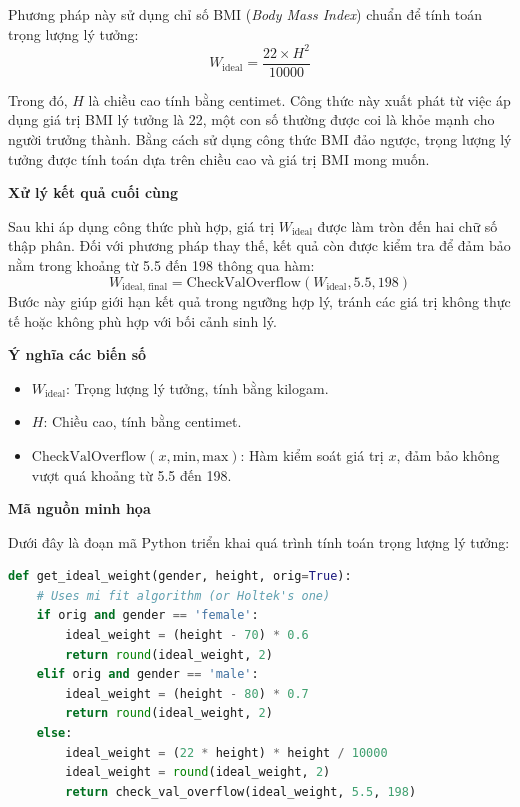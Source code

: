 Phương pháp này sử dụng chỉ số BMI (\textit{Body Mass Index}) chuẩn để tính toán trọng lượng lý tưởng:
\[
W_{\text{ideal}} = \frac{22 \times H^2}{10000}
\]

Trong đó, \( H \) là chiều cao tính bằng centimet. Công thức này xuất phát từ việc áp dụng giá trị BMI lý tưởng là 22, một con số thường được coi là khỏe mạnh cho người trưởng thành. Bằng cách sử dụng công thức BMI đảo ngược, trọng lượng lý tưởng được tính toán dựa trên chiều cao và giá trị BMI mong muốn.

\textbf{Xử lý kết quả cuối cùng}

Sau khi áp dụng công thức phù hợp, giá trị \( W_{\text{ideal}} \) được làm tròn đến hai chữ số thập phân. Đối với phương pháp thay thế, kết quả còn được kiểm tra để đảm bảo nằm trong khoảng từ 5.5 đến 198 thông qua hàm:
\[
W_{\text{ideal, final}} = \text{CheckValOverflow}(W_{\text{ideal}}, 5.5, 198)
\]
Bước này giúp giới hạn kết quả trong ngưỡng hợp lý, tránh các giá trị không thực tế hoặc không phù hợp với bối cảnh sinh lý.

\textbf{Ý nghĩa các biến số}

\begin{itemize}
    \item \( W_{\text{ideal}} \): Trọng lượng lý tưởng, tính bằng kilogam.
    \item \( H \): Chiều cao, tính bằng centimet.
    \item \( \text{CheckValOverflow}(x, \text{min}, \text{max}) \): Hàm kiểm soát giá trị \( x \), đảm bảo không vượt quá khoảng từ 5.5 đến 198.
\end{itemize}

\textbf{Mã nguồn minh họa}

Dưới đây là đoạn mã Python triển khai quá trình tính toán trọng lượng lý tưởng:

\begin{lstlisting}[language=python,caption={Hàm tính toán cân nặng lý tưởng của cơ thể}]
def get_ideal_weight(gender, height, orig=True):
    # Uses mi fit algorithm (or Holtek's one)
    if orig and gender == 'female':
        ideal_weight = (height - 70) * 0.6
        return round(ideal_weight, 2)
    elif orig and gender == 'male':
        ideal_weight = (height - 80) * 0.7
        return round(ideal_weight, 2)
    else:
        ideal_weight = (22 * height) * height / 10000
        ideal_weight = round(ideal_weight, 2)
        return check_val_overflow(ideal_weight, 5.5, 198)
\end{lstlisting}

